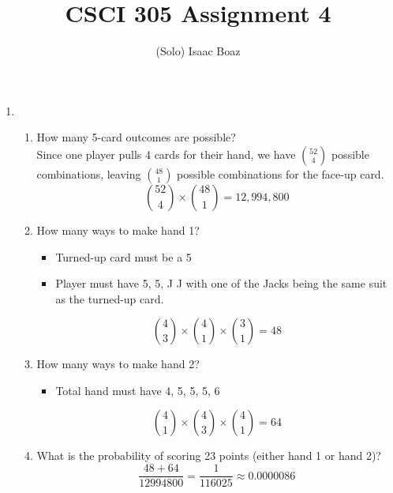 \documentclass{article}
\title{\vspace{-2.5em}CSCI 305 Assignment 4}
\author{(Solo) Isaac Boaz}
\begin{document}
\maketitle

\begin{enumerate}
    \item \begin{enumerate}[label=\arabic*.]
              \item How many 5-card outcomes are possible? \\
                    Since one player pulls 4 cards for their hand, we have ${52 \choose 4}$ possible combinations, leaving ${48 \choose 1}$ possible combinations for the face-up card.
                    \begin{equation*}
                        {52 \choose 4} \times {48 \choose 1} = 12,994,800
                    \end{equation*}
              \item How many ways to make hand 1?
                    \begin{itemize}
                        \item Turned-up card must be a 5
                        \item Player must have 5, 5, J J with one of the Jacks being the same suit as the turned-up card.
                    \end{itemize}
                    \begin{equation*}
                        {4 \choose 3} \times {4 \choose 1} \times {3 \choose 1} = 48
                    \end{equation*}
              \item How many ways to make hand 2?
                    \begin{itemize}
                        \item Total hand must have 4, 5, 5, 5, 6
                    \end{itemize}
                    \begin{equation*}
                        {4 \choose 1} \times {4 \choose 3} \times {4 \choose 1} = 64
                    \end{equation*}
              \item What is the probability of scoring 23 points (either hand 1 or hand 2)?
                    \begin{equation*}
                        \frac{48 + 64}{\num{12994800}} = \frac{1}{\num{116025}} \approx 0.0000086
                    \end{equation*}

\end{enumerate}
\end{enumerate}
\end{document}
